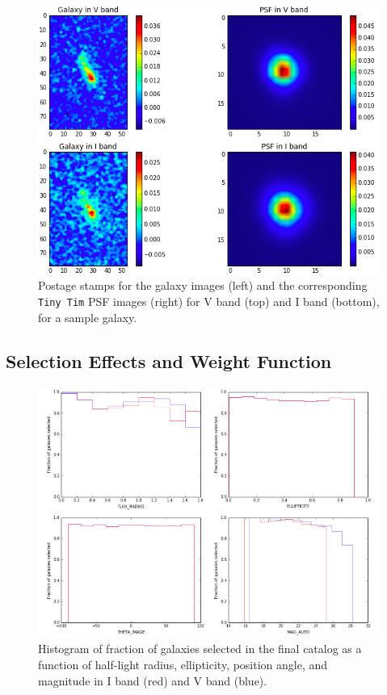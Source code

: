 \documentclass[a4paper,11pt]{article}
\begin{document}
\begin{figure}[h]
\centering\includegraphics[width=1.\linewidth]{pstamps.png}
\caption{Postage stamps for the galaxy images (left) and the corresponding {\tt Tiny Tim} PSF images (right) for V band (top) and I band (bottom), for a sample galaxy.}
\label{fig:pstamps}
\end{figure}

\subsection{Selection Effects and Weight Function}

\begin{figure}[h]
\centering\includegraphics[width=0.8\linewidth]{frac_param.png}
\caption{Histogram of fraction of galaxies selected in the final catalog as a function of half-light radius, ellipticity, position angle, and magnitude 
in I band (red) and V band (blue).}
\label{fig:frac_param}
\end{figure}
\end{document}
